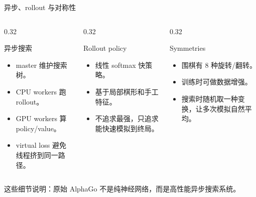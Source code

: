 \documentclass[UTF8,aspectratio=169,10pt]{ctexbeamer}
\begin{document}
\begin{frame}{异步、rollout 与对称性}
  \begin{columns}[T,onlytextwidth]
    \begin{column}{0.32\textwidth}
      \begin{block}{异步搜索}
        \footnotesize
        \begin{itemize}
          \item master 维护搜索树。
          \item CPU workers 跑 rollout。
          \item GPU workers 算 policy/value。
          \item virtual loss 避免线程挤到同一路径。
        \end{itemize}
      \end{block}
    \end{column}
    \begin{column}{0.32\textwidth}
      \begin{block}{Rollout policy}
        \footnotesize
        \begin{itemize}
          \item 线性 softmax 快策略。
          \item 基于局部棋形和手工特征。
          \item 不追求最强，只追求能快速模拟到终局。
        \end{itemize}
      \end{block}
    \end{column}
    \begin{column}{0.32\textwidth}
      \begin{block}{Symmetries}
        \footnotesize
        \begin{itemize}
          \item 围棋有 8 种旋转/翻转。
          \item 训练时可做数据增强。
          \item 搜索时随机取一种变换，让多次模拟自然平均。
        \end{itemize}
      \end{block}
    \end{column}
  \end{columns}

  \vspace{0.24cm}
  \begin{center}
    \small
    这些细节说明：原始 AlphaGo 不是纯神经网络，而是高性能异步搜索系统。
  \end{center}
\end{frame}
\end{document}

